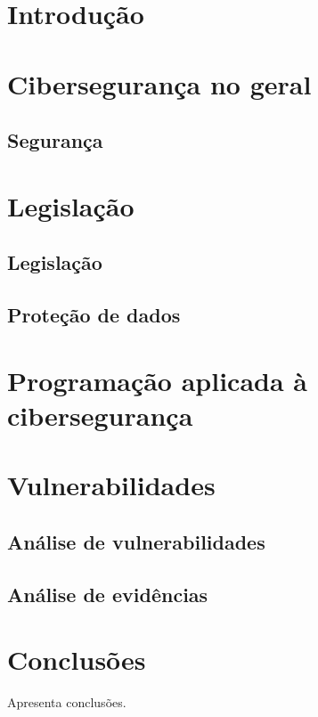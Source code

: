 \documentclass{report}
\begin{document}
\tableofcontents


\clearpage
{}

\chapter*{Introdução}
\label{chap.introducao}

\chapter{Cibersegurança no geral}
\label{chap.cibersegurancanogeral}
\section{Segurança}

\chapter{Legislação}
\label{chap.legislacao}
\section{Legislação}
\section{Proteção de dados}

\chapter{Programação aplicada à cibersegurança}
\label{chap.programacao}

\chapter{Vulnerabilidades}
\label{chap.vulnerabilidade}
\section{Análise de vulnerabilidades}
\section{Análise de evidências}

\chapter{Conclusões}
\label{chap.conclusao}
Apresenta conclusões.
\end{document}
